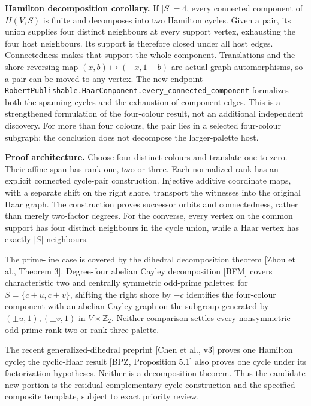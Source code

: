 \documentclass[
  11pt,
]{article}
\begin{document}
\textbf{Hamilton decomposition corollary.} If \(|S|=4\), every connected
component of \(H(V,S)\) is finite and decomposes into two Hamilton
cycles. Given a pair, its union supplies four distinct neighbours at
every support vertex, exhausting the four host neighbours. Its support
is therefore closed under all host edges. Connectedness makes that
support the whole component. Translations and the shore-reversing map
\((x,b)\mapsto(-x,1-b)\) are actual graph automorphisms, so a pair can
be moved to any vertex. The new endpoint
\href{https://github.com/alejandrozu/openmath-2026-judging/blob/70c5ec3107658182f22c207d4c50f53f9cb3e602/robert-review-2026-10-07/lean/HaarComponents.lean\#L73}{\texttt{RobertPublishable.HaarComponent.every\_connected\_component}}
formalizes both the spanning cycles and the exhaustion of component
edges. This is a strengthened formulation of the four-colour result, not
an additional independent discovery. For more than four colours, the
pair lies in a selected four-colour subgraph; the conclusion does not
decompose the larger-palette host.

\textbf{Proof architecture.} Choose four distinct colours and translate
one to zero. Their affine span has rank one, two or three. Each
normalized rank has an explicit connected cycle-pair construction.
Injective additive coordinate maps, with a separate shift on the right
shore, transport the witnesses into the original Haar graph. The
construction proves successor orbits and connectedness, rather than
merely two-factor degrees. For the converse, every vertex on the common
support has four distinct neighbours in the cycle union, while a Haar
vertex has exactly \(|S|\) neighbours.

The prime-line case is covered by the dihedral decomposition theorem
{[}Zhou et al., Theorem 3{]}. Degree-four abelian Cayley decomposition
{[}BFM{]} covers characteristic two and centrally symmetric odd-prime
palettes: for \(S=\{c\pm u,c\pm v\}\), shifting the right shore by
\(-c\) identifies the four-colour component with an abelian Cayley graph
on the subgroup generated by \((\pm u,1),(\pm v,1)\) in
\(V\times\mathbb Z_2\). Neither comparison settles every nonsymmetric
odd-prime rank-two or rank-three palette.

The recent generalized-dihedral preprint {[}Chen et al., v3{]} proves
one Hamilton cycle; the cyclic-Haar result {[}BPZ, Proposition 5.1{]}
also proves one cycle under its factorization hypotheses. Neither is a
decomposition theorem. Thus the candidate new portion is the residual
complementary-cycle construction and the specified composite template,
subject to exact priority review.
\end{document}
